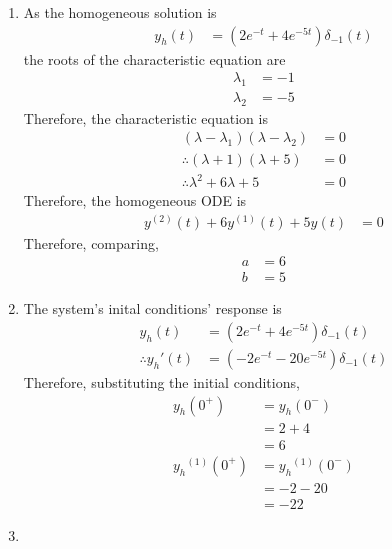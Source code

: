 \documentclass[fleqn, a4paper, 11pt, oneside]{amsart}
\theoremstyle{definition}
\theoremstyle{theorem}
\begin{document}
\begin{solution}
	\begin{enumerate}[leftmargin=*]
		\item
			As the homogeneous solution is
			\begin{align*}
				y_h(t) & = \left( 2 e^{-t} + 4 e^{-5 t} \right) \delta_{-1}(t)
			\end{align*}
			the roots of the characteristic equation are
			\begin{align*}
				\lambda_1 & = -1 \\
				\lambda_2 & = -5
			\end{align*}
			Therefore, the characteristic equation is
			\begin{align*}
				(\lambda - \lambda_1) (\lambda - \lambda_2) & = 0 \\
				\therefore (\lambda + 1) (\lambda + 5)      & = 0 \\
				\therefore \lambda^2 + 6 \lambda + 5        & = 0
			\end{align*}
			Therefore, the homogeneous ODE is
			\begin{align*}
				y^{(2)}(t) + 6 y^{(1)}(t) + 5 y(t) & = 0
			\end{align*}
			Therefore, comparing,
			\begin{align*}
				a & = 6 \\
				b & = 5
			\end{align*}
		\item
			The system's inital conditions' response is
			\begin{align*}
				y_h(t)               & = \left( 2 e^{-t} + 4 e^{-5 t} \right) \delta_{-1}(t) \\
				\therefore {y_h}'(t) & = \left( -2 e^{-t} - 20 e^{-5 t} \right) \delta_{-1}(t)
			\end{align*}
			Therefore, substituting the initial conditions,
			\begin{align*}
				y_h(0^+)         & = y_h(0^-)         \\
                                                 & = 2 + 4            \\
                                                 & = 6                \\
				{y_h}^{(1)}(0^+) & = {y_h}^{(1)}(0^-) \\
                                                 & = -2 - 20          \\
                                                 & = -22
			\end{align*}
		\item

\end{enumerate}
\end{solution}
\end{document}
